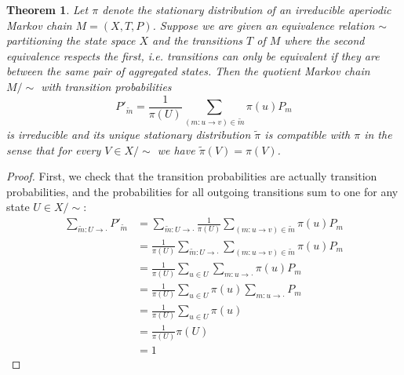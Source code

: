\documentclass{article}
\newtheorem{theorem}{Theorem}
\theoremstyle{definition}
\begin{document}
\begin{theorem}
    Let $\pi$ denote the stationary distribution of an irreducible aperiodic Markov chain $M=(X,T,P)$. Suppose we are given an equivalence relation $\sim$ partitioning the state space $X$ and the transitions $T$ of $M$ where the second equivalence respects the first, i.e. transitions can only be equivalent if they are between the same pair of aggregated states. Then the quotient Markov chain $M/\sim$ with transition probabilities
    \[P'_{\widetilde{m}} = \frac{1}{\pi(U)} \sum_{(m:u\to v)\in\widetilde{m}}\pi(u)P_m\]
    is irreducible and its unique stationary distribution $\widetilde\pi$ is compatible with $\pi$ in the sense that for every $V\in X/\sim$ we have $\widetilde\pi(V)=\pi(V)$.
\end{theorem}
\begin{proof}
    First, we check that the transition probabilities are actually transition probabilities, and the probabilities for all outgoing transitions sum to one for any state $U\in X/\sim$:
    \begin{align*}
    \sum_{\widetilde{m}: U\to \cdot} P'_{\widetilde{m}} 
        &= \sum_{\widetilde{m}: U\to \cdot} \frac{1}{\pi(U)} \sum_{(m:u\to v)\in\widetilde{m}}\pi(u) P_m \\
        &= \frac{1}{\pi(U)} \sum_{\widetilde{m}: U\to \cdot} \sum_{(m:u\to v)\in\widetilde{m}}\pi(u) P_m \\
        &= \frac{1}{\pi(U)} \sum_{u\in U} \sum_{m: u\to \cdot}\pi(u) P_m \\
        &= \frac{1}{\pi(U)} \sum_{u\in U} \pi(u) \sum_{m: u\to \cdot } P_m \\
        &= \frac{1}{\pi(U)} \sum_{u\in U} \pi(u) \\
        &= \frac{1}{\pi(U)} \pi(U)  \\
        &= 1
    \end{align*}


\end{proof}
\end{document}

